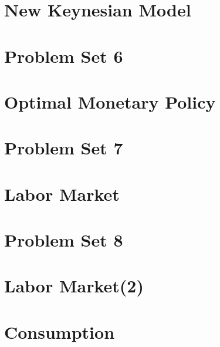 \documentclass[a4paper]{report}
\begin{document}
\chapter{New Keynesian Model}

\chapter{Problem Set 6}

\chapter{Optimal Monetary Policy}

\chapter{Problem Set 7}

\chapter{Labor Market}

\chapter{Problem Set 8}

\chapter{Labor Market(2)}

\chapter{Consumption}




\end{document}

